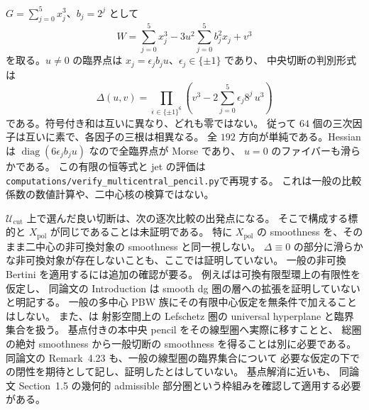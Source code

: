 \begin{example}
\label{mcpn:ex:fermat-pencil}
$G=\sum_{j=0}^{5}x_j^3$、$b_j=2^j$ として
\[
 W=\sum_{j=0}^{5}x_j^3-3u^2\sum_{j=0}^{5}b_j^2x_j+v^3
\]
を取る。$u\ne0$ の臨界点は $x_j=\epsilon_jb_ju$、$\epsilon_j\in\{\pm1\}$ であり、
中央切断の判別形式は
\[
 \Delta(u,v)=\prod_{\epsilon\in\{\pm1\}^6}
          \left(v^3-2\sum_{j=0}^{5}\epsilon_j8^j\,u^3\right)
\]
である。符号付き和は互いに異なり、どれも零ではない。
従って $64$ 個の三次因子は互いに素で、各因子の三根は相異なる。
全 $192$ 方向が単純である。Hessian は
$\operatorname{diag}(6\epsilon_jb_ju)$ なので全臨界点が Morse であり、
$u=0$ のファイバーも滑らかである。
この有限の恒等式と jet の評価は
\texttt{computations/verify\_multicentral\_pencil.py}で再現する。
これは一般の比較係数の数値計算や、二中心核の検算ではない。
\end{example}

\begin{remark}[切断の判別と全対象の比較の区別]
\label{mcpn:rem:scope}
$\mathcal U_{\mathrm{cut}}$ 上で選んだ良い切断は、次の逐次比較の出発点になる。
そこで構成する標的と $X_{\mathrm{pol}}$ が同じであることは未証明である。
特に $X_{\mathrm{pol}}$ の smoothness を、そのまま二中心の非可換対象の
smoothness と同一視しない。
$\Delta\equiv0$ の部分に滑らかな非可換対象が存在しないことも、ここでは証明していない。
一般の非可換 Bertini を適用するには追加の確認が要る。
例えば\cite[Proposition~2.1]{CMORSVBertini}は可換有限型環上の有限性を仮定し、
同論文の Introduction は smooth dg 圏の層への拡張を証明していないと明記する。
一般の多中心 PBW 族にその有限中心仮定を無条件で加えることはしない。
また、\cite[Lemma~7.18, Proposition~7.19]{CRSPerry}は
射影空間上の Lefschetz 圏の universal hyperplane と臨界集合を扱う。
基点付きの本中央 pencil をその線型圏へ実際に移すことと、
総圏の絶対 smoothness から一般切断の smoothness を得ることは別に必要である。
同論文の Remark~4.23 も、一般の線型圏の臨界集合について
必要な仮定の下での閉性を期待として記し、証明したとはしていない。
基点解消に近い\cite[Theorems~3.3, 4.5]{CMOJiangLeungBlowup}も、
同論文 Section~1.5 の幾何的 admissible 部分圏という枠組みを確認して適用する必要がある。
\end{remark}
